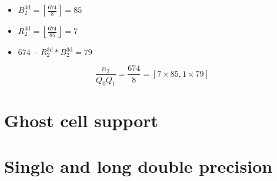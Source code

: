 \begin{itemize}
 \item $B_2^\textrm{3d} = \left\lceil \frac{674}{8} \right\rceil = 85$
 \item $R_2^\textrm{3d} = \left\lfloor \frac{674}{85} \right\rfloor = 7$
 \item $674 - R_2^\textrm{3d}*B_2^\textrm{3d} = 79$
\end{itemize}
\begin{equation*}
  \frac{n_2}{Q_0Q_1} = \frac{674}{8} = \left[7\times 85, 1\times 79 \right]
\end{equation*}

\section{Ghost cell support}


\section{Single and long double precision}
